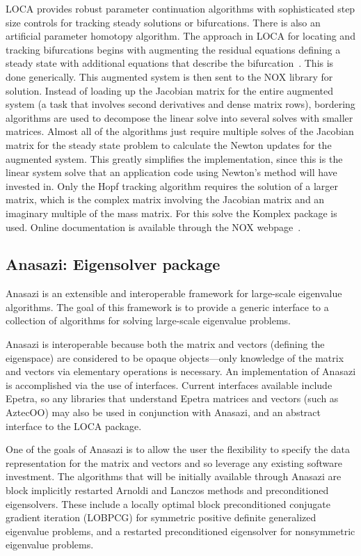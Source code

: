 \documentclass[acmtoms,acmnow]{acmtrans2m}
\begin{document}
LOCA provides robust parameter continuation algorithms 
with sophisticated step size controls for tracking steady
solutions or bifurcations. There is also an
artificial parameter homotopy algorithm.
The approach in LOCA for locating and tracking bifurcations begins with augmenting 
the residual equations defining a steady state with additional equations that 
describe the bifurcation~\cite{LOCA-manual}. This is done generically. This 
augmented system is then sent to the NOX library for solution.
Instead of loading up the Jacobian matrix for the entire 
augmented system (a task that involves second derivatives and dense matrix rows), 
bordering algorithms are used to decompose the linear solve into several solves 
with smaller matrices. Almost all of the algorithms just require multiple solves 
of the Jacobian matrix for the steady state problem to calculate the Newton 
updates for the augmented system. This greatly simplifies the implementation, 
since this is the linear system solve that an application code using Newton's 
method will have invested in. Only the Hopf tracking algorithm requires 
the solution of a larger matrix, which is the complex matrix involving the 
Jacobian matrix and an imaginary multiple of the mass matrix. For this solve
the Komplex package is used. Online documentation is available
through the NOX webpage~\cite{NOX-home-page}.

\subsection{Anasazi: Eigensolver package}


Anasazi is an extensible and interoperable framework for 
large-scale eigenvalue algorithms.  The goal of this 
framework is to provide a generic interface to a collection 
of algorithms for solving large-scale eigenvalue problems. 

Anasazi is interoperable because both the matrix and vectors (defining the
eigenspace) are considered to be opaque objects---only knowledge of the matrix and
vectors via elementary operations is necessary. An implementation of Anasazi
is accomplished via the use of interfaces. Current interfaces available include
Epetra, so any libraries that understand Epetra matrices and vectors (such
as AztecOO) may also be used in conjunction with Anasazi, and an abstract interface
to the LOCA package.

One of the goals of Anasazi is to allow the user the flexibility 
to specify the data representation for the matrix and vectors and 
so leverage any existing software
investment. The algorithms that will be initially available through 
Anasazi are block implicitly restarted Arnoldi and Lanczos methods 
and preconditioned eigensolvers.
These include a locally optimal block preconditioned conjugate 
gradient iteration  (LOBPCG) for symmetric positive definite 
generalized eigenvalue problems, and a 
restarted preconditioned eigensolver for nonsymmetric eigenvalue problems.
\end{document}
